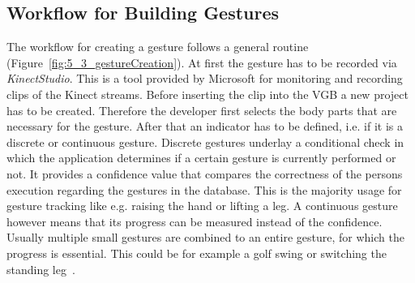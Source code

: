 \subsection{Workflow for Building Gestures}

The workflow for creating a gesture follows a general routine (Figure~\ref{fig:5_3_gestureCreation}). 
At first the gesture has to be recorded via \textit{KinectStudio}. This is a tool provided by Microsoft for monitoring and recording clips of the Kinect streams. Before inserting the clip into the VGB a new project has to be created. Therefore the developer first selects the body parts that are necessary for the gesture. After that an indicator has to be defined, i.e. if it is a discrete or continuous gesture. Discrete gestures underlay a conditional check in which the application determines if a certain gesture is currently performed or not. It provides a confidence value that compares the correctness of the persons execution regarding the gestures in the database. This is the majority usage for gesture tracking like e.g. raising the hand or lifting a leg. A continuous gesture however means that its progress can be measured instead of the confidence. Usually multiple small gestures are combined to an entire gesture, for which the progress is essential. This could be for example a golf swing or switching the standing leg~\cite{MicrosoftVGB}.

